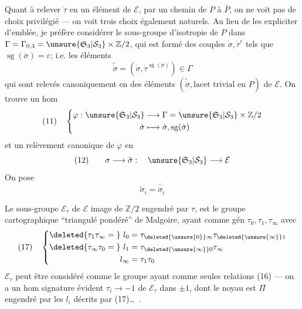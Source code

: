 Quant à relever $\dot\tau$ en un élément de $\mathcal E$, par un chemin de $P$ à $\bar P$, on ne voit pas de choix privilégié --- on voit trois choix également naturels. Au lieu de les expliciter d'emblée, je préfère considérer le sous-groupe d'isotropie de $P$ dans $\Gamma=\Gamma_{0,3}=\unsure{\mathfrak S_3|\mathcal S_3}\times\mathbb Z/2$, qui est formé des couples $\dot\sigma,\dot\tau^\varepsilon$ tels que $\operatorname{sg}(\dot\sigma)=\varepsilon$;  i.e. les éléments
\[
\widetilde{\dot\sigma}=(\dot\sigma,\dot\tau^{\operatorname{sg}(\dot\sigma)})\in\Gamma
\]
qui sont relevés canoniquement en des éléments $(\widetilde{\dot\sigma},\text{lacet trivial en }P)$ de $\mathcal E$. On trouve un hom
\[
(11)\quad\left\{\begin{aligned}
\varphi:\unsure{\mathfrak S_3|\mathcal S_3}&\longrightarrow\Gamma=\unsure{\mathfrak S_3|\mathcal S_3}\times\mathbb Z/2\\
\dot\sigma&\longmapsto\dot\sigma,\operatorname{sg}(\dot\sigma)
\end{aligned}\right.
\]
et un relèvement canonique de $\varphi$ en
\[
(12)\qquad\sigma\longrightarrow\tilde\sigma:\quad\unsure{\mathfrak S_3|\mathcal S_3}\longrightarrow\mathcal E
\]
On pose
\[
\tilde\sigma_i=\widetilde{\dot\sigma_i}
\]

Le sous-groupe $\mathcal E_\tau$ de $\mathcal E$ image  de $\mathbb Z/2$ engendré par $\tau$, est le groupe cartographique ``triangulé pondéré'' de Malgoire, ayant comme gén $\tau_0,\tau_1,\tau_\infty$  avec
\[
(17)\quad\left\{\begin{aligned}
\deleted{\tau_1\tau_\infty={}}\ l_0&=\tau_{\deleted{\unsure{0}}\infty}\tau_{\deleted{\unsure{\infty}}1}\\
\deleted{\tau_\infty\tau_0={}}\ l_1&=\tau_{\deleted{\unsure{\infty}}0}\tau_\infty\\
l_\infty&=\tau_1\tau_0
\end{aligned}\right.
\]
$\mathcal E_\tau$ peut être considéré comme le groupe ayant comme  seules relations (16) --- on a un hom signature évident $\tau_i\longrightarrow-1$ de $\mathcal E_\tau$ dans $\pm1$, dont le noyau est $\Pi$ engendré par les $l_i$ décrits par (17)\ldots\ .

